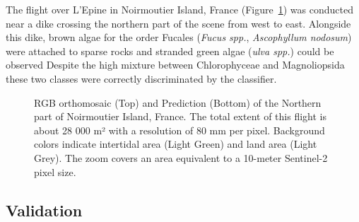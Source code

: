 \documentclass[
  number]{elsarticle}
\begin{document}
The flight over L'Epine in Noirmoutier Island, France
(Figure~\ref{fig-Dike}) was conducted near a dike crossing the northern
part of the scene from west to east. Alongside this dike, brown algae
for the order Fucales (\emph{Fucus spp.}, \emph{Ascophyllum nodosum})
were attached to sparse rocks and stranded green algae (\emph{ulva
spp.}) could be observed Despite the high mixture between Chlorophyceae
and Magnoliopsida these two classes were correctly discriminated by the
classifier.

\label{cell-fig-Dike}
\begin{figure}[H]


\caption{\label{fig-Dike}RGB orthomosaic (Top) and Prediction (Bottom)
of the Northern part of Noirmoutier Island, France. The total extent of
this flight is about 28 000 m² with a resolution of 80 mm per pixel.
Background colors indicate intertidal area (Light Green) and land area
(Light Grey). The zoom covers an area equivalent to a 10-meter
Sentinel-2 pixel size.}

\end{figure}%

\subsection{Validation}\label{validation-1}
\end{document}
